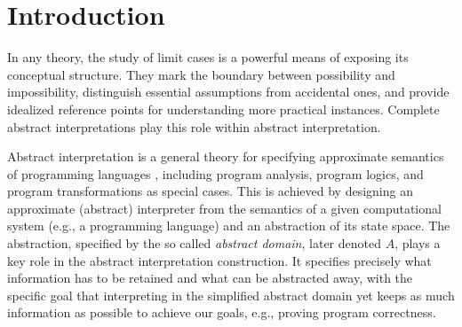 \documentclass[runningheads]{llncs}
\def\cAA{\ensuremath{A}}
\begin{document}
\section{Introduction}

In any theory, the study of limit cases is a powerful means of exposing its conceptual structure. They mark the boundary between possibility and impossibility, distinguish essential assumptions from accidental ones, and provide idealized reference points for understanding more practical instances. Complete abstract interpretations play this role within abstract interpretation. 

\smallskip

Abstract interpretation is a general theory for specifying approximate semantics of programming languages \cite{CC77}, including program analysis, program logics, and program transformations as special cases. 
This is achieved by designing an approximate (abstract) interpreter from the semantics of a given computational system (e.g., a programming language) and an abstraction of its state space. The abstraction, specified by the so called {\em abstract domain\/}, later denoted $\cAA$, plays a key role in the abstract interpretation construction. It specifies precisely what information has to be retained and what can be abstracted away, with the specific goal that interpreting in the simplified abstract domain yet keeps as much information as possible to achieve our goals, e.g., proving program correctness. 

\smallskip
\end{document}
